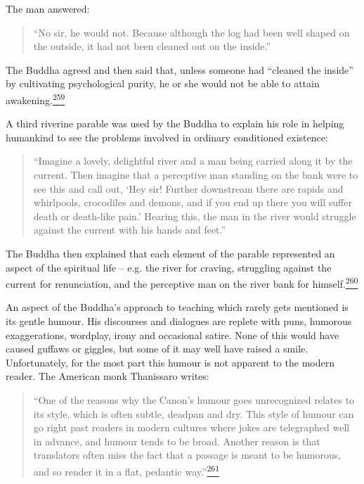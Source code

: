 The man answered:

\begin{quote}
``No sir, he would not. Because although the log had been well shaped on
the outside, it had not been cleaned out on the inside.''
\end{quote}

The Buddha agreed and then said that, unless someone had ``cleaned the
inside'' by cultivating psychological purity, he or she would not be
able to attain
awakening.\label{footprints_split_010.html_fnref259}\hyperref[footprints_split_024.htmlux5cux23fn259]{\textsuperscript{259}}

A third riverine parable was used by the Buddha to explain his role in
helping humankind to see the problems involved in ordinary conditioned
existence:

\begin{quote}
``Imagine a lovely, delightful river and a man being carried along it by
the current. Then imagine that a perceptive man standing on the bank
were to see this and call out, `Hey sir! Further downstream there are
rapids and whirlpools, crocodiles and demons, and if you end up there
you will suffer death or death-like pain.' Hearing this, the man in the
river would struggle against the current with his hands and feet.''
\end{quote}

The Buddha then explained that each element of the parable represented
an aspect of the spiritual life -- e.g. the river for craving,
struggling against the current for renunciation, and the perceptive man
on the river bank for
himself.\label{footprints_split_010.html_fnref260}\hyperref[footprints_split_024.htmlux5cux23fn260]{\textsuperscript{260}}

An aspect of the Buddha's approach to teaching which rarely gets
mentioned is its gentle humour. His discourses and dialogues are replete
with puns, humorous exaggerations, wordplay, irony and occasional
satire. None of this would have caused guffaws or giggles, but some of
it may well have raised a smile. Unfortunately, for the most part this
humour is not apparent to the modern reader. The American monk
Thanissaro writes:

\begin{quote}
``One of the reasons why the Canon's humour goes unrecognized relates to
its style, which is often subtle, deadpan and dry. This style of humour
can go right past readers in modern cultures where jokes are telegraphed
well in advance, and humour tends to be broad. Another reason is that
translators often miss the fact that a passage is meant to be humorous,
and so render it in a flat, pedantic
way.''\label{footprints_split_010.html_fnref261}\hyperref[footprints_split_024.htmlux5cux23fn261]{\textsuperscript{261}}
\end{quote}


